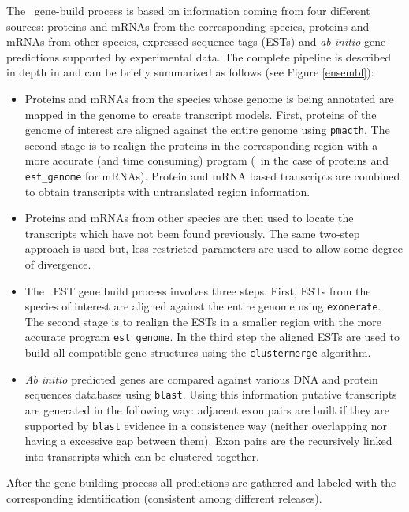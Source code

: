 The \ensembl\ gene-build process is based on information coming from
four different sources: proteins and mRNAs from the corresponding
species, proteins and mRNAs from other species, expressed sequence
tags (ESTs) and \textit{ab initio} gene predictions supported by
experimental data. The complete pipeline is described in depth in
\cite{curwen:2004a} and can be briefly summarized as follows 
(see Figure \ref{ensembl}): 

\begin{itemize}
\item Proteins and mRNAs from the species whose genome is being 
annotated are mapped in the genome to create transcript models.
First, proteins of the genome of interest are aligned against the
entire genome using \texttt{pmacth}. The second stage is to realign the
proteins in the corresponding region with a more accurate (and time
consuming) program (\genewise\ in the case of proteins and
\texttt{est\_genome} for mRNAs). Protein and mRNA based transcripts
are combined to obtain transcripts with untranslated region
information.

\item Proteins and mRNAs from other species are then used to locate the 
transcripts which have not been found previously. The same two-step
approach is used but, less restricted parameters are used to allow
some degree of divergence.

\item The \ensembl\ EST gene build process involves three steps. First, 
ESTs from the species of interest are aligned against the entire genome 
using \texttt{exonerate}. The second stage is to realign the ESTs in a 
smaller region with the more accurate program \texttt{est\_genome}. 
In the third step the aligned ESTs are used to build all compatible 
gene structures using the \texttt{clustermerge} algorithm.

\item \textit{Ab initio} predicted genes are compared against various 
DNA and protein sequences databases using \texttt{blast}. Using this
information putative transcripts are generated in the following way:
adjacent exon pairs are built if they are supported by \texttt{blast}
evidence in a consistence way (neither overlapping nor having a
excessive gap between them). Exon pairs are the recursively linked
into transcripts which can be clustered together.
\end{itemize}

After the gene-building process all predictions are gathered and
labeled with the corresponding identification (consistent among
different releases).

